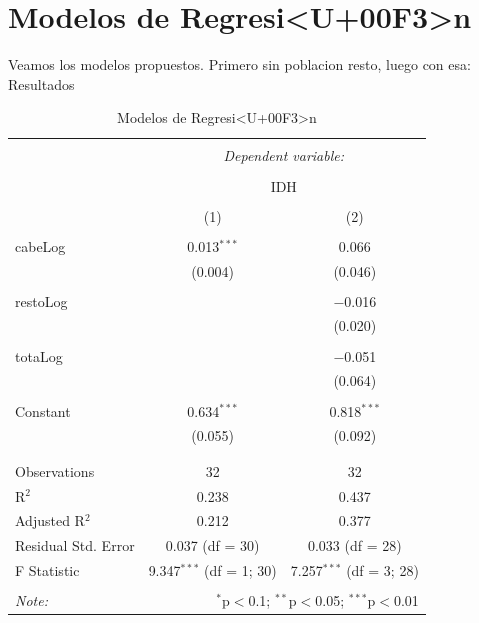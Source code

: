 \section{Modelos de Regresi<U+00F3>n}
Veamos los modelos propuestos.
Primero sin poblacion resto, luego con esa:
Resultados
\begin{table}[!htbp] \centering 
  \caption{Modelos de Regresi<U+00F3>n} 
  \label{regresiones} 
\begin{tabular}{@{\extracolsep{5pt}}lcc} 
\\[-1.8ex]\hline 
\hline \\[-1.8ex] 
 & \multicolumn{2}{c}{\textit{Dependent variable:}} \\ 
\cline{2-3} 
\\[-1.8ex] & \multicolumn{2}{c}{IDH} \\ 
\\[-1.8ex] & (1) & (2)\\ 
\hline \\[-1.8ex] 
 cabeLog & 0.013$^{***}$ & 0.066 \\ 
  & (0.004) & (0.046) \\ 
  & & \\ 
 restoLog &  & $-$0.016 \\ 
  &  & (0.020) \\ 
  & & \\ 
 totaLog &  & $-$0.051 \\ 
  &  & (0.064) \\ 
  & & \\ 
 Constant & 0.634$^{***}$ & 0.818$^{***}$ \\ 
  & (0.055) & (0.092) \\ 
  & & \\ 
\hline \\[-1.8ex] 
Observations & 32 & 32 \\ 
R$^{2}$ & 0.238 & 0.437 \\ 
Adjusted R$^{2}$ & 0.212 & 0.377 \\ 
Residual Std. Error & 0.037 (df = 30) & 0.033 (df = 28) \\ 
F Statistic & 9.347$^{***}$ (df = 1; 30) & 7.257$^{***}$ (df = 3; 28) \\ 
\hline 
\hline \\[-1.8ex] 
\textit{Note:}  & \multicolumn{2}{r}{$^{*}$p$<$0.1; $^{**}$p$<$0.05; $^{***}$p$<$0.01} \\ 
\end{tabular} 
\end{table} \clearpage
